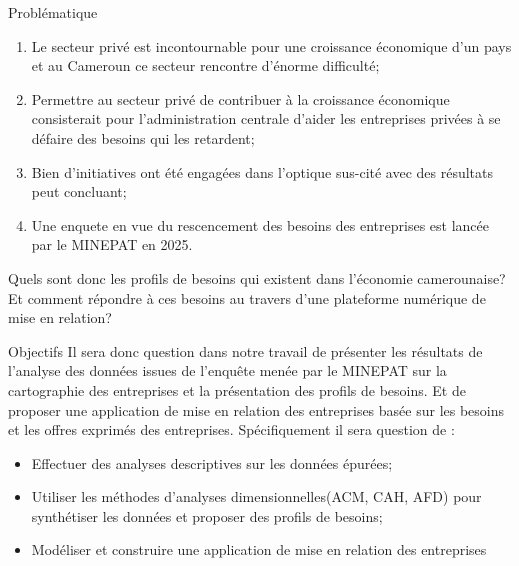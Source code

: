 \documentclass[aspectratio=169, 10pt]{beamer}
\begin{document}
\begin{frame}{Problématique}
	
		\begin{enumerate}
			\item Le secteur privé est incontournable pour une croissance économique d'un pays et au Cameroun ce secteur rencontre d'énorme difficulté;
			
			\item Permettre au secteur privé de contribuer à la croissance économique consisterait pour l'administration centrale d'aider les entreprises privées à se défaire des besoins qui les retardent;
			\item Bien d'initiatives ont été engagées dans l'optique sus-cité avec des résultats peut concluant;
			\item Une enquete en vue du rescencement des besoins des entreprises est lancée par le MINEPAT en 2025. 
		\end{enumerate}
	Quels sont donc les profils de besoins qui existent dans l'économie camerounaise? Et comment répondre à ces besoins au travers d'une plateforme numérique de mise en relation?
\end{frame}
\begin{frame}{Objectifs}
	Il sera donc question dans notre travail de présenter les résultats de l'analyse des données issues de l'enqu\^ete menée par le MINEPAT sur la cartographie des entreprises et la présentation des profils de besoins. Et de proposer une application de mise en relation des entreprises basée sur les besoins et les offres exprimés des entreprises.
	Spécifiquement il sera question de :
	\begin{itemize}
		\item Effectuer des analyses descriptives sur les données épurées;
		\item Utiliser les méthodes d'analyses dimensionnelles(ACM, CAH, AFD) pour synthétiser les données et proposer des profils de besoins;
		\item Modéliser et construire une application de mise en relation des entreprises
	\end{itemize}
\end{frame}
\end{document}
